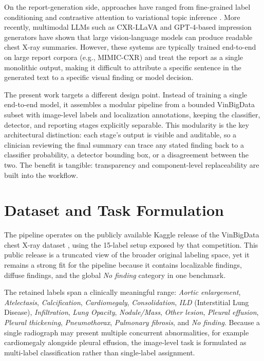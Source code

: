 \documentclass[conference]{IEEEtran}
\begin{document}
On the report-generation side, approaches have ranged from fine-grained label conditioning \cite{syedamahmood2020finegrained} and contrastive attention \cite{liu2021contrastive} to variational topic inference \cite{najdenkoska2022uncertainty}. More recently, multimodal LLMs such as CXR-LLaVA \cite{lee2023cxrllava} and GPT-4-based impression generators \cite{ziegelmayer2023gpt4} have shown that large vision-language models can produce readable chest X-ray summaries. However, these systems are typically trained end-to-end on large report corpora (e.g., MIMIC-CXR) and treat the report as a single monolithic output, making it difficult to attribute a specific sentence in the generated text to a specific visual finding or model decision.

The present work targets a different design point. Instead of training a single end-to-end model, it assembles a modular pipeline from a bounded VinBigData subset with image-level labels and localization annotations, keeping the classifier, detector, and reporting stages explicitly separable. This modularity is the key architectural distinction: each stage's output is visible and auditable, so a clinician reviewing the final summary can trace any stated finding back to a classifier probability, a detector bounding box, or a disagreement between the two. The benefit is tangible: transparency and component-level replaceability are built into the workflow.

\section{Dataset and Task Formulation}
The pipeline operates on the publicly available Kaggle release of the VinBigData chest X-ray dataset \cite{vinbigdata}, using the 15-label setup exposed by that competition. This public release is a truncated view of the broader original labeling space, yet it remains a strong fit for the pipeline because it contains localizable findings, diffuse findings, and the global \textit{No finding} category in one benchmark.

The retained labels span a clinically meaningful range: \textit{Aortic enlargement}, \textit{Atelectasis}, \textit{Calcification}, \textit{Cardiomegaly}, \textit{Consolidation}, \textit{ILD} (Interstitial Lung Disease), \textit{Infiltration}, \textit{Lung Opacity}, \textit{Nodule/Mass}, \textit{Other lesion}, \textit{Pleural effusion}, \textit{Pleural thickening}, \textit{Pneumothorax}, \textit{Pulmonary fibrosis}, and \textit{No finding}. Because a single radiograph may present multiple concurrent abnormalities, for example cardiomegaly alongside pleural effusion, the image-level task is formulated as multi-label classification rather than single-label assignment.
\end{document}
